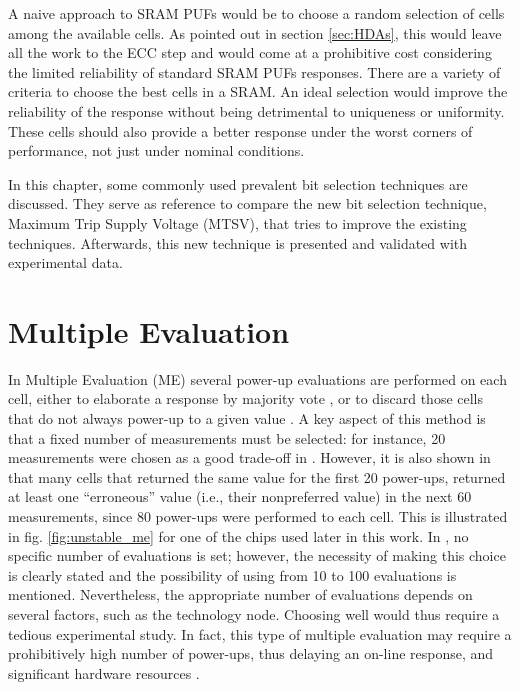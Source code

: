 \label{chap:4}

A naive approach to SRAM PUFs would be to choose a random selection of cells among the available cells. As pointed out in section \ref{sec:HDAs}, this would leave all the work to the ECC step and would come at a prohibitive cost considering the limited reliability of standard SRAM PUFs responses. There are a variety of criteria to choose the best cells in a SRAM. An ideal selection would improve the reliability of the response without being detrimental to uniqueness or uniformity. These cells should also provide a better response under the worst corners of performance, not just under nominal conditions. 

In this chapter, some commonly used prevalent bit selection techniques are discussed. They serve as reference to compare the new bit selection technique, Maximum Trip Supply Voltage (MTSV), that tries to improve the existing techniques. Afterwards, this new technique is presented and validated with experimental data.

\section{Multiple Evaluation}
\label{sec:ME}
In Multiple Evaluation (ME) several power-up evaluations are performed on each cell, either to elaborate a response by majority vote \cite{Bhargava2012}, or to discard those cells that do not always power-up to a given value \cite{Baturone2015}. A key aspect of this method is that a fixed number of measurements must be selected: for instance, 20 measurements were chosen as a good trade-off in \cite{Baturone2015}. However, it is also shown in \cite{Baturone2015} that many cells that returned the same value for the first 20 power-ups, returned at least one “erroneous” value (i.e., their nonpreferred value) in the next 60 measurements, since 80 power-ups were performed to each cell. This is illustrated in fig. \ref{fig:unstable_me} for one of the chips used later in this work. In \cite{Bhargava2012}, no specific number of evaluations is set; however, the necessity of making this choice is clearly stated and the possibility of using from 10 to 100 evaluations is mentioned. Nevertheless, the appropriate number of evaluations depends on several factors, such as the technology node. Choosing well would thus require a tedious experimental study. In fact, this type of multiple evaluation may require a prohibitively high number of power-ups, thus delaying an on-line response, and significant hardware resources \cite{Liu2017}. 

